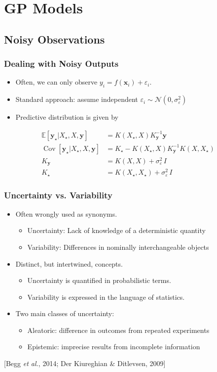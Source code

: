 \documentclass{beamer}
\newcommand{\vect}[1]{\boldsymbol{#1}}
\newcommand{\E}[1]{\mathbb{E}\left[#1\right]}
\newcommand{\nml}{\mathcal{N}}
\let\eps\varepsilon
\DeclareMathOperator{\Cov}{Cov}
\newcommand{\citeAY}[1]{
	\begin{flushright}
		{\footnotesize [#1]}
	\end{flushright}
}
\begin{document}
	\section{GP Models}
	\subsection{Noisy Observations}
	\begin{frame}
		\frametitle{Dealing with Noisy Outputs}
		\begin{itemize}
			\item Often, we can only observe $y_i=f(\vect{x}_i)+\eps_i$.
			\item Standard approach: assume independent $\eps_i\sim\nml(0,\sigma_\eps^2)$
			\item Predictive distribution is given by
		\end{itemize}
		\begin{align*}
			\E{\vect{y}_\star|X_\star,X,\vect{y}} & =K(X_\star,X)K_{\vect{y}}^{-1}\vect{y}\\
			\Cov\left[\vect{y}_\star|X_\star,X,\vect{y}\right] & =K_{\star}-K(X_\star,X)K_{\vect{y}}^{-1}K(X,X_\star)\\
			K_{\vect{y}} & =K(X,X)+\sigma_\eps^2\,I\\
			K_{\star} & =K(X_\star,X_\star)+\sigma_\eps^2\,I
		\end{align*}
	\end{frame}

	\begin{frame}
		\frametitle{Uncertainty vs. Variability}
		\begin{itemize}
			\item Often wrongly used as synonyms.
			\begin{itemize}
				\item Uncertainty: Lack of knowledge of a deterministic quantity
				\item Variability: Differences in nominally interchangeable objects
			\end{itemize}
			\item Distinct, but intertwined, concepts.
			\begin{itemize}
				\item Uncertainty is quantified in probabilistic terms.
				\item Variability is expressed in the language of statistics.
			\end{itemize}
			\item Two main classes of uncertainty:
			\begin{itemize}
				\item Aleatoric: difference in outcomes from repeated experiments
				\item Epistemic: imprecise results from incomplete information
			\end{itemize}
		\end{itemize}
		\citeAY{Begg \emph{et al.}, 2014; Der Kiureghian \& Ditlevsen, 2009}
	\end{frame}
	
\end{document}
